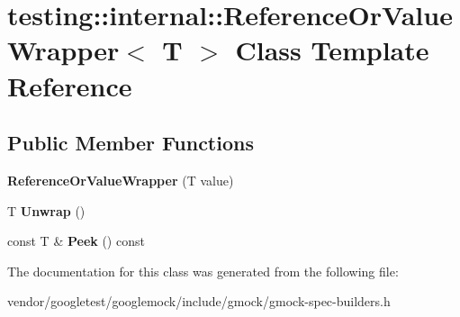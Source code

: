 \hypertarget{classtesting_1_1internal_1_1_reference_or_value_wrapper}{}\section{testing\+:\+:internal\+:\+:Reference\+Or\+Value\+Wrapper$<$ T $>$ Class Template Reference}
\label{classtesting_1_1internal_1_1_reference_or_value_wrapper}
\subsection*{Public Member Functions}
\begin{DoxyCompactItemize}
\item 
\mbox{\label{classtesting_1_1internal_1_1_reference_or_value_wrapper_ae5544acd43aa0feed92aa51b4186ede9}} 
{\bfseries Reference\+Or\+Value\+Wrapper} (T value)
\item 
\mbox{\label{classtesting_1_1internal_1_1_reference_or_value_wrapper_a5a6505b809ba770725e7b8091927a5ba}} 
T {\bfseries Unwrap} ()
\item 
\mbox{\label{classtesting_1_1internal_1_1_reference_or_value_wrapper_a235cdb913959a71ad2a98fdd0965fe59}} 
const T \& {\bfseries Peek} () const
\end{DoxyCompactItemize}


The documentation for this class was generated from the following file\+:\begin{DoxyCompactItemize}
\item 
vendor/googletest/googlemock/include/gmock/gmock-\/spec-\/builders.\+h\end{DoxyCompactItemize}

